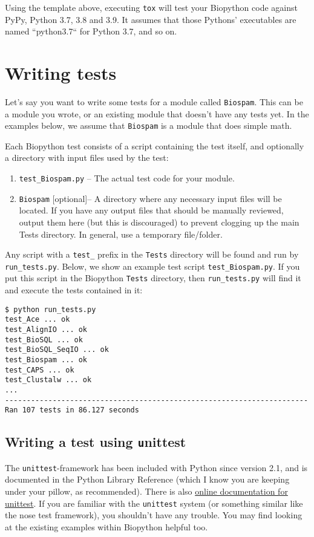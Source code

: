 Using the template above, executing \texttt{tox} will test your Biopython
code against PyPy, Python 3.7, 3.8 and 3.9. It assumes that those Pythons'
executables are named ``python3.7`` for Python 3.7, and so on.


\section{Writing tests}

Let's say you want to write some tests for a module called \verb|Biospam|.
This can be a module you wrote, or an existing module that doesn't have
any tests yet.  In the examples below, we assume that
\verb|Biospam| is a module that does simple math.

Each Biopython test consists of a script containing the test itself, and
optionally a directory with input files used by the test:

\begin{enumerate}
  \item \verb|test_Biospam.py| -- The actual test code for your module.
  \item \verb|Biospam| [optional]-- A directory where any necessary input files
    will be located. If you have any output files that should be manually
    reviewed, output them here (but this is discouraged) to prevent clogging
    up the main Tests directory. In general, use a temporary file/folder.
\end{enumerate}

Any script with a \verb|test_| prefix in the \verb|Tests| directory will be found and run by \verb|run_tests.py|. Below, we show an example test script \verb|test_Biospam.py|. If you put this script in the Biopython \verb|Tests| directory, then \verb|run_tests.py| will find it and execute the tests contained in it:

\begin{verbatim}
$ python run_tests.py
test_Ace ... ok
test_AlignIO ... ok
test_BioSQL ... ok
test_BioSQL_SeqIO ... ok
test_Biospam ... ok
test_CAPS ... ok
test_Clustalw ... ok
...
----------------------------------------------------------------------
Ran 107 tests in 86.127 seconds
\end{verbatim}

\subsection{Writing a test using {\texttt unittest}}

The \verb|unittest|-framework has been included with Python since version
2.1, and is documented in the Python Library Reference (which I know you
are keeping under your pillow, as recommended).  There is also
\href{https://docs.python.org/3/library/unittest.html}{online documentation
for unittest}.
If you are familiar with the \verb|unittest| system (or something similar
like the nose test framework), you shouldn't have any trouble.  You may
find looking at the existing examples within Biopython helpful too.

